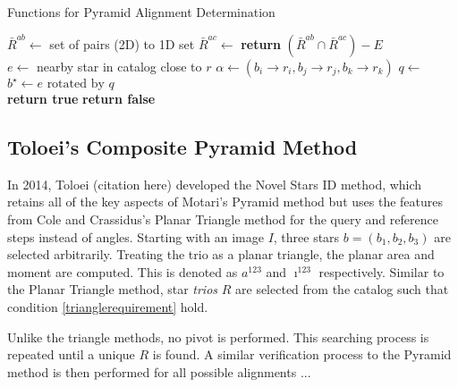 \begin{algorithm}
\caption{Functions for Pyramid Alignment Determination} \label{Pyramid Helpers}
\begin{algorithmic}[1]
\State $\bar{R}^{ab} \gets $  \Comment set of pairs (2D) to 1D set
\State $\bar{R}^{ac} \gets $ 
\State \textbf{return} $(\bar{R}^{ab} \cap \bar{R}^{ac}) - E$
\EndFunction
\\
\State $e \gets $ nearby star in catalog close to $r$
\State $\alpha \gets (b_i \rightarrow r_i, b_j \rightarrow r_j, b_k \rightarrow r_k)$
\State $q \gets $ 
\State $b^{\star} \gets e \text{ rotated by } q$
\\
\State \textbf{return true}
\Else
\State \textbf{return false}
\EndIf
\EndFunction
\end{algorithmic}
\end{algorithm}

\subsection{Toloei's Composite Pyramid Method}
In 2014, Toloei (citation here) developed the Novel Stars ID method, which retains all of the key aspects of Motari's Pyramid method but uses the features from Cole and Crassidus's Planar Triangle method for the query and reference steps instead of angles. Starting with an image $I$, three stars $b = (b_1, b_2, b_3)$ are selected arbitrarily. Treating the trio as a planar triangle, the planar area and moment are computed. This is denoted as $a^{123}$ and $\imath^{123}$ respectively. Similar to the Planar Triangle method, star \textit{trios} $R$ are selected from the catalog such that condition \eqref{trianglerequirement} hold.

Unlike the triangle methods, no pivot is performed. This searching process is repeated until a unique $R$ is found. A similar verification process to the Pyramid method is then performed for all possible alignments ...

